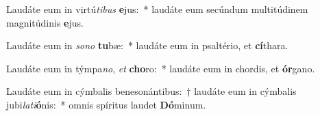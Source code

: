 \item Laudáte eum in virtú\textit{ti}\textit{bus} \textbf{e}jus:~* laudáte eum secúndum multitúdinem magnitúdinis \textbf{e}jus.
\item Laudáte eum in \textit{so}\textit{no} \textbf{tu}bæ:~* laudáte eum in psaltério, et \textbf{cí}thara.
\item Laudáte eum in týmpa\textit{no}, \textit{et} \textbf{cho}ro:~* laudáte eum in chordis, et \textbf{ór}gano.
\item Laudáte eum in cýmbalis benesonántibus:~† laudáte eum in cýmbalis jubi\textit{la}\textit{ti}\textbf{ó}nis:~* omnis spíritus laudet \textbf{Dó}minum.
